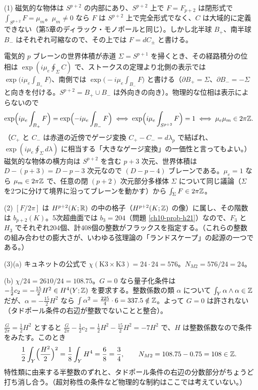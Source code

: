 \begin{solution}
(1) 磁気的な物体は $S^{p+2}$ の内部にあり、$S^{p+2}$ 上で $F=F_{p+2}$ は閉形式で $\int_{S^{p+2}}F=\mu_m$。$\mu_m\ne0$ なら $F$ は $S^{p+2}$ 上で完全形式でなく、$C$ は大域的に定義できない（第5章のディラック・モノポールと同じ）。しかし北半球 $B_+$、南半球 $B_-$ はそれぞれ可縮なので、その上では $F=dC_\pm$ と書ける。

電気的 $p$ ブレーンの世界体積が赤道 $\Sigma=S^{p+1}$ を掃くとき、その経路積分の位相は $\exp(i\mu_e\oint_\Sigma C)$ で、ストークスの定理より北側の表示では $\exp\bigl(i\mu_e\int_{B_+}F\bigr)$、南側では $\exp\bigl(-i\mu_e\int_{B_-}F\bigr)$ と書ける（$\partial B_+=\Sigma$、$\partial B_-=-\Sigma$ と向きを付ける。$S^{p+2}=B_+\cup B_-$ は外向きの向き）。物理的な位相は表示によらないので
\[
\exp\Bigl(i\mu_e\int_{B_+}F\Bigr)=\exp\Bigl(-i\mu_e\int_{B_-}F\Bigr)
\iff \exp\Bigl(i\mu_e\int_{S^{p+2}}F\Bigr)=1
\iff \mu_e\mu_m\in2\pi\mathbb{Z} .
\]
（$C_+$ と $C_-$ は赤道の近傍でゲージ変換 $C_+-C_-=d\lambda_p$ で結ばれ、$\exp(i\mu_e\oint_\Sigma d\lambda)$ に相当する「大きなゲージ変換」の一価性と言ってもよい。）磁気的な物体の横方向は $S^{p+2}$ を含む $p+3$ 次元、世界体積は $D-(p+3)=D-p-3$ 次元なので $(D-p-4)$ ブレーンである。$\mu_e=1$ なら $\mu_m\in2\pi\mathbb{Z}$ で、任意の閉 $(p+2)$ 次元部分多様体 $\Sigma$ について同じ議論（$\Sigma$ を2つに分けて境界に沿ってブレーンを動かす）から $\int_\Sigma F\in2\pi\mathbb{Z}$。

(2) $[F/2\pi]$ は $H^{p+2}(K;\mathbb{R})$ の中の格子（$H^{p+2}(K;\mathbb{Z})$ の像）に属し、その階数は $b_{p+2}(K)$。5次超曲面では $b_3=204$（問題 \ref{ch10-prob-h21}）なので、$F_3$ と $H_3$ でそれぞれ204個、計408個の整数がフラックスを指定する。（これらの整数の組み合わせの膨大さが、いわゆる弦理論の「ランドスケープ」の起源の一つである。）

(3)(a) キュネットの公式で $\chi(\mathrm{K3}\times\mathrm{K3})=24\cdot24=576$。$N_{M2}=576/24=24$。

(b) $\chi/24=2610/24=108.75$。$G=0$ なら量子化条件は $-\frac12c_2=-\frac{15}{2}H^2\in H^4(Y;\mathbb{Z})$ を要求する。整数係数の類 $\alpha$ について $\int_Y\alpha\wedge\alpha\in\mathbb{Z}$ だが、$\alpha=-\frac{15}{2}H^2$ なら $\int\alpha^2=\frac{225}{4}\cdot6=337.5\notin\mathbb{Z}$。よって $G=0$ は許されない（タドポール条件の右辺が整数でないことと整合）。

$\frac{G}{2\pi}=\frac12H^2$ とすると $\frac{G}{2\pi}-\frac12c_2=\frac12H^2-\frac{15}{2}H^2=-7H^2$ で、$H$ は整数係数なので条件をみたす。このとき
\[
\frac12\int_Y\Bigl(\frac{H^2}{2}\Bigr)^2=\frac18\int_YH^4=\frac68=\frac34,\qquad N_{M2}=108.75-0.75=108\in\mathbb{Z} .
\]
特性類に由来する半整数のずれと、タドポール条件の右辺の分数部分がちょうど打ち消し合う。（超対称性の条件など物理的な制約はここでは考えていない。）
\end{solution}

